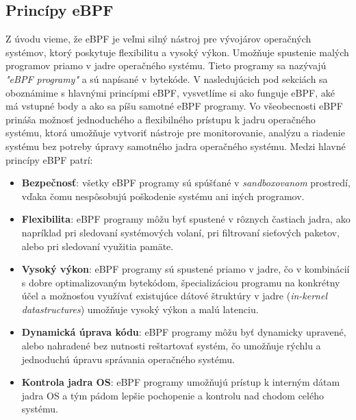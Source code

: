 \subsection{Princípy eBPF}
Z úvodu vieme, že eBPF je veľmi silný nástroj pre vývojárov operačných systémov, ktorý poskytuje flexibilitu a vysoký výkon. 
Umožňuje spustenie malých programov priamo v jadre operačného systému. Tieto programy sa nazývajú \emph{"eBPF programy"} a sú napísané v bytekóde. 
V nasledujúcich pod sekciách sa oboznámime s hlavnými princípmi eBPF, vysvetlíme si ako funguje eBPF, aké má vstupné body a ako sa píšu samotné eBPF programy. 
Vo všeobecnosti eBPF prináša možnosť jednoduchého a flexibilného prístupu k jadru operačného systému, ktorá umožňuje vytvoriť nástroje pre monitorovanie, 
analýzu a riadenie systému bez potreby úpravy samotného jadra operačného systému. 
Medzi hlavné princípy eBPF patrí: 
\begin{itemize}
    \item \textbf{Bezpečnosť}: všetky eBPF programy sú spúšťané v \emph{sandboxovanom} prostredí, vďaka čomu nespôsobujú poškodenie systému ani iných programov.
    \item \textbf{Flexibilita}: eBPF programy môžu byť spustené v rôznych častiach jadra, ako napríklad pri sledovaní systémových volaní, 
    pri filtrovaní sieťových paketov, alebo  pri sledovaní využitia pamäte.
    \item \textbf{Vysoký výkon}: eBPF programy sú spustené priamo v jadre, čo v kombinácií s dobre optimalizovaným bytekódom, 
    špecializáciou programu na konkrétny účel a možnosťou využívať existujúce dátové štruktúry v jadre (\emph{in-kernel datastructures})  
    umožňuje vysoký výkon a malú latenciu.
    \item \textbf{Dynamická úprava kódu}: eBPF programy môžu byť dynamicky upravené, alebo nahradené bez nutnosti reštartovať systém, 
    čo umožňuje rýchlu a jednoduchú úpravu správania operačného systému.
    \item \textbf{Kontrola jadra OS}: eBPF programy umožňujú prístup k interným dátam jadra OS a tým pádom lepšie pochopenie a kontrolu 
    nad chodom celého systému.
\end{itemize}

